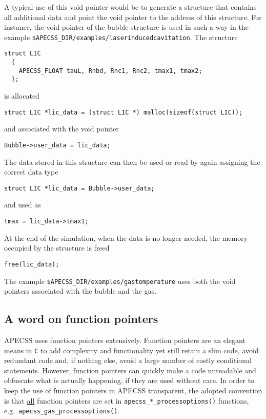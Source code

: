 A typical use of this void pointer would be to generate a structure that contains all additional data and point the void pointer to the address of this structure. For instance, the void pointer of the bubble structure is used in such a way in the example {\tt \$APECSS\_DIR/examples/laserinducedcavitation}. The structure
\begin{lstlisting}[style=CStyle,numbers=none]
  struct LIC
  {
    APECSS_FLOAT tauL, Rnbd, Rnc1, Rnc2, tmax1, tmax2;
  };
\end{lstlisting}\vspace{-0.75em}
is allocated
\begin{lstlisting}[style=CStyle,numbers=none]
  struct LIC *lic_data = (struct LIC *) malloc(sizeof(struct LIC));
\end{lstlisting}\vspace{-0.75em}
and associated with the void pointer
\begin{lstlisting}[style=CStyle,numbers=none]
  Bubble->user_data = lic_data;
\end{lstlisting}\vspace{-0.75em}
The data stored in this structure can then be used or read by again assigning the correct data type
\begin{lstlisting}[style=CStyle,numbers=none]
  struct LIC *lic_data = Bubble->user_data;
\end{lstlisting}\vspace{-0.75em}
and used as
\begin{lstlisting}[style=CStyle,numbers=none]
  tmax = lic_data->tmax1;
\end{lstlisting}\vspace{-0.75em}
At the end of the simulation, when the data is no longer needed, the memory occupied by the structure is freed
\begin{lstlisting}[style=CStyle,numbers=none]
  free(lic_data);
\end{lstlisting}%

The example {\tt \$APECSS\_DIR/examples/gastemperature} uses both the void pointers associated with the bubble and the gas.

\subsection{A word on function pointers}

APECSS uses function pointers extensively. Function pointers are an elegant means in {\tt C} to add complexity and functionality yet still retain a slim code, avoid redundant code and, if nothing else, avoid a large number of costly conditional statements. However, function pointers can quickly make a code unreadable and obfuscate what is actually happening, if they are used without care. In order to keep the use of function pointers in APECSS transparent, the adopted convention is that \uline{all} function pointers are set in {\tt apecss\_*\_processoptions()} functions, e.g.~{\tt apecss\_gas\_processoptions()}.

